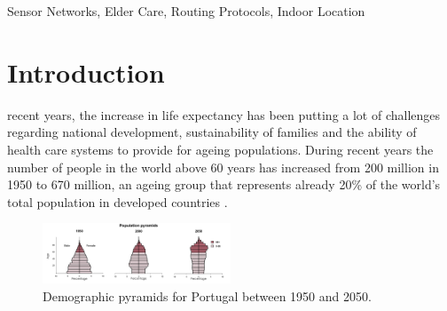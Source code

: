 


\begin{IEEEkeywords}
Sensor Networks, Elder Care, Routing Protocols, Indoor Location
\end{IEEEkeywords}

%
\IEEEpeerreviewmaketitle

\section{Introduction}
% 
% 
% 
% 
 recent years, the increase in life expectancy has been putting a lot of challenges regarding national development, sustainability of families and the ability of health care systems to provide for ageing populations. During recent years the number of people in the world above 60 years has increased from 200 million in 1950 to 670 million, an ageing group that represents already 20\% of the world's total population in developed countries \cite{1}.

\begin{figure}[!htb]
  \centering
  \includegraphics[width=0.50\textwidth]{img/01_demografia_pt.png}
  \caption{Demographic pyramids for Portugal between 1950 and 2050\cite{1}.}
  \label{fig:1:demog_pt}
\end{figure}
 
